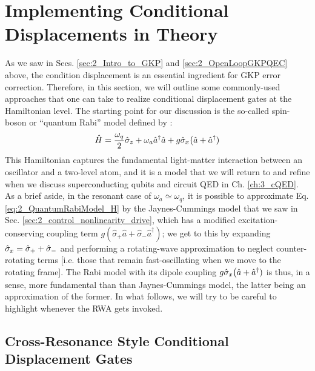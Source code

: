 \clearpage
\section{Implementing Conditional Displacements in Theory}

As we saw in Secs. \ref{sec:2_Intro_to_GKP} and \ref{sec:2_OpenLoopGKPQEC} above, the condition displacement is an essential ingredient for GKP error correction. Therefore, in this section, we will  outline some commonly-used approaches that one can take to realize conditional displacement gates at the Hamiltonian level. The starting point for our discussion is the so-called spin-boson or ``quantum Rabi'' model defined by \cite{hagelstein2004introductory}:
\begin{equation}
\hat{H} = \frac{\omega_q}{2}\hat{\sigma}_z + \omega_a \hat{a}^\dagger \hat{a} + g\hat{\sigma}_x\big(\hat{a} + \hat{a}^\dagger)
\label{eq:2_QuantumRabiModel_H}
\end{equation}
This Hamiltonian captures the fundamental light-matter interaction between an oscillator and a two-level atom, and it is a model that we will return to and refine when we discuss superconducting qubits and circuit QED in Ch. \ref{ch:3_cQED}. As a brief aside, in the resonant case of $\omega_a \simeq \omega_q$, it is possible to approximate Eq. \eqref{eq:2_QuantumRabiModel_H} by the Jaynes-Cummings model that we saw in Sec. \ref{sec:2_control_nonlinearity_drive}, which has a modified excitation-conserving coupling term $g(\hat{\sigma}_+\hat{a} + \hat{\sigma}_-\hat{a}^\dagger)$; we get to this by expanding $\hat{\sigma}_x = \hat{\sigma}_+ + \hat{\sigma}_-$ and performing a rotating-wave approximation to neglect counter-rotating terms [i.e. those that remain fast-oscillating when we move to the rotating frame]. The Rabi model with its dipole coupling $g\hat{\sigma}_x\big(\hat{a} + \hat{a}^\dagger)$ is thus, in a sense, more fundamental than than Jaynes-Cummings model, the latter being an approximation of the former. In what follows, we will try to be careful to highlight whenever the RWA gets invoked.

\subsection{Cross-Resonance Style Conditional Displacement Gates}

